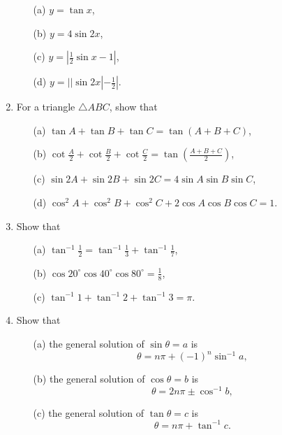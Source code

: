\documentclass{article}
\begin{document}
\begin{enumerate}
       \begin{itemize}
              \item[(a)] $y=\tan x$,
              \item[(b)] $y=4\sin 2x$,
              \item[(c)] $y=|\frac 12\sin x-1|$,
              \item[(d)] $y=||\sin 2x|-\frac 12|$.
       \end{itemize}
\item For a triangle $\triangle ABC$, show that
       \begin{itemize}
              \item[(a)] $\tan A+\tan B+\tan C=\tan(A+B+C)$,
              \item[(b)] $\cot \frac A2+\cot \frac B2+\cot \frac C2=\tan(\frac{A+B+C}{2})$,
              \item[(c)] $\sin 2A+\sin 2B+\sin 2C=4\sin A\sin B\sin C$,
              \item[(d)] $\cos^2 A+\cos^2 B+\cos^2 C+2\cos A\cos B\cos C=1$.
       \end{itemize}
\item Show that
       \begin{itemize}
              \item[(a)] $\displaystyle \tan^{-1}\frac 12=\tan^{-1}\frac 13+\tan^{-1}\frac 17$,
              \item[(b)] $\displaystyle \cos 20^{\circ}\cos40^{\circ}\cos 80^{\circ}=\frac 18$,
              \item[(c)] $\tan^{-1}1+\tan^{-1}2+\tan^{-1}3=\pi$.
       \end{itemize}
\item Show that
       \begin{itemize}
              \item[(a)] the general solution of $\sin \theta=a$ is\[\theta=n\pi+(-1)^n\sin^{-1}a,\]
              \item[(b)] the general solution of $\cos \theta=b$ is\[\theta=2n\pi\pm\cos^{-1}b,\]
              \item[(c)] the general solution of $\tan \theta=c$ is \[\theta=n\pi+\tan^{-1}c.\]
       \end{itemize}
\end{enumerate}
\end{document}
